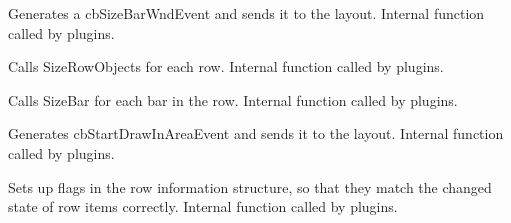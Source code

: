 \label{cbdockpanesizebar}


Generates a cbSizeBarWndEvent and sends it to the layout.
Internal function called by plugins.


\label{cbdockpanesizepaneobjects}


Calls SizeRowObjects for each row.
Internal function called by plugins.


\label{cbdockpanesizerowobjects}


Calls SizeBar for each bar in the row.
Internal function called by plugins.


\label{cbdockpanestartdrawinarea}


Generates cbStartDrawInAreaEvent and sends it to the layout.
Internal function called by plugins.


\label{cbdockpanesyncrowflags}


Sets up flags in the row information structure, so that
they match the changed state of row items correctly.
Internal function called by plugins.

